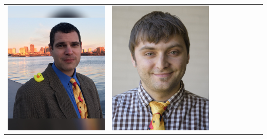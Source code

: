\documentclass[landscape,a0paper,fontscale=0.292]{baposter}
\begin{document}
\begin{poster}
{\begin{center}
\begin{tabularx}{\linewidth}{X X X X X X X X X}
{\centering \includegraphics[width=0.65\linewidth]{novitzky.jpg}}&
{\centering \includegraphics[width=0.65\linewidth]{cap.jpg}}&

\end{tabularx}
\end{center}}
\end{poster}
\end{document}

